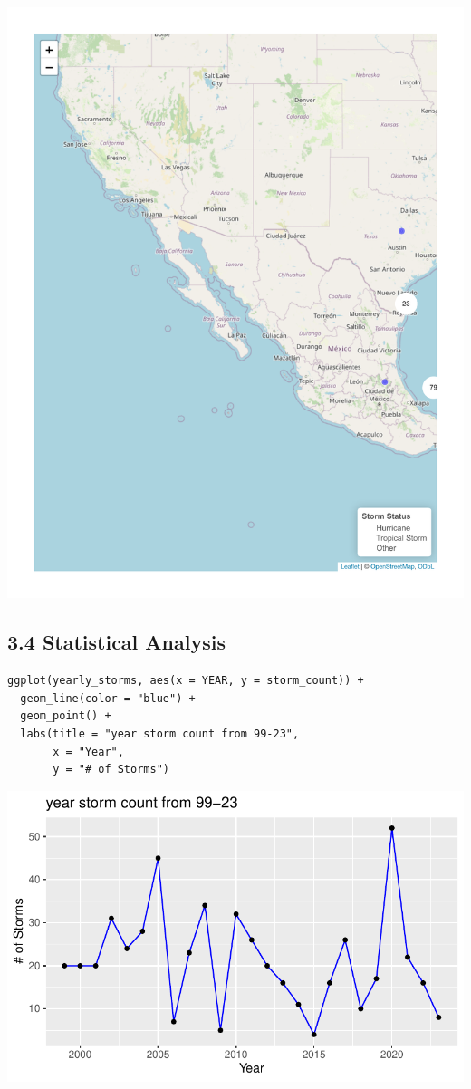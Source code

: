 \documentclass[12pt,letterpaper]{article}
\begin{document}
\includegraphics{GroupTask3_files/figure-pdf/LeafletMap-1.pdf}

\subsection{3.4 Statistical Analysis}\label{statistical-analysis}

\begin{verbatim}
ggplot(yearly_storms, aes(x = YEAR, y = storm_count)) +
  geom_line(color = "blue") +
  geom_point() +
  labs(title = "year storm count from 99-23",
       x = "Year",
       y = "# of Storms")
\end{verbatim}

\includegraphics{GroupTask3_files/figure-pdf/Plots-1.pdf}
\end{document}
